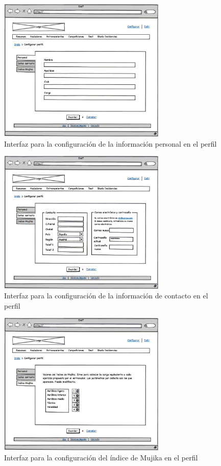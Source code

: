 		\begin{figure}[H]
		  \centering
		    \includegraphics[width=8cm]{./eps/p_interfaz/7_Conf_personal.eps}
		  \caption{Interfaz para la configuración de la información personal en el perfil}
		  \label{fig:interfaz_conf_personal}
		\end{figure}
		
		\begin{figure}[H]
		  \centering
		    \includegraphics[width=8cm]{./eps/p_interfaz/8_Conf_contacto.eps}
		  \caption{Interfaz para la configuración de la información de contacto en el perfil}
		  \label{fig:interfaz_conf_contacto}
		\end{figure}
		
		\begin{figure}[H]
		  \centering
		    \includegraphics[width=8cm]{./eps/p_interfaz/9_Conf_mujika.eps}
		  \caption{Interfaz para la configuración del índice de Mujika en el perfil}
		  \label{fig:interfaz_conf_mujika}
		\end{figure}
		

